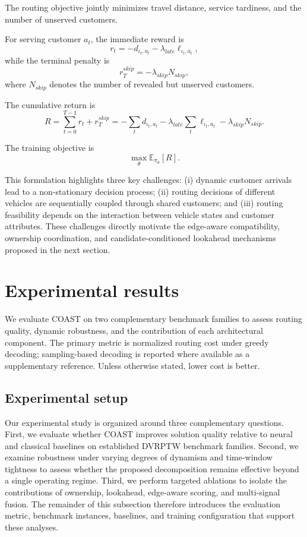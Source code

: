 \documentclass[conference]{IEEEtran}
\begin{document}
The routing objective jointly minimizes travel distance, service tardiness, and
the number of unserved customers.

For serving customer $a_t$, the immediate reward is
\[
r_t
=
-d_{\iota_t,a_t}
-
\lambda_{late}\ell_{\iota_t,a_t},
\]
while the terminal penalty is
\[
r_T^{skip}
=
-\lambda_{skip}N_{skip},
\]
where $N_{skip}$ denotes the number of revealed but unserved customers.

The cumulative return is
\[
R
=
\sum_{t=0}^{T-1}r_t+r_T^{skip}
=
-\sum_t d_{\iota_t,a_t}
-\lambda_{late}\sum_t\ell_{\iota_t,a_t}
-\lambda_{skip}N_{skip}.
\]

The training objective is
\[
\max_\theta \mathbb{E}_{\pi_\theta}[R].
\]

This formulation highlights three key challenges: (i) dynamic customer arrivals
lead to a non-stationary decision process; (ii) routing decisions of different
vehicles are sequentially coupled through shared customers; and (iii) routing
feasibility depends on the interaction between vehicle states and customer
attributes. These challenges directly motivate the edge-aware compatibility,
ownership coordination, and candidate-conditioned lookahead mechanisms proposed
in the next section.


\section{Experimental results} \label{sec:experiment}

We evaluate COAST on two complementary benchmark families to assess routing quality, dynamic robustness, and the contribution of each architectural component. The primary metric is normalized routing cost under greedy decoding; sampling-based decoding is reported where available as a supplementary reference. Unless otherwise stated, lower cost is better.

\subsection{Experimental setup}

Our experimental study is organized around three complementary questions. First, we evaluate whether COAST improves solution quality relative to neural and classical baselines on established DVRPTW benchmark families. Second, we examine robustness under varying degrees of dynamism and time-window tightness to assess whether the proposed decomposition remains effective beyond a single operating regime. Third, we perform targeted ablations to isolate the contributions of ownership, lookahead, edge-aware scoring, and multi-signal fusion. The remainder of this subsection therefore introduces the evaluation metric, benchmark instances, baselines, and training configuration that support these analyses.
\end{document}
